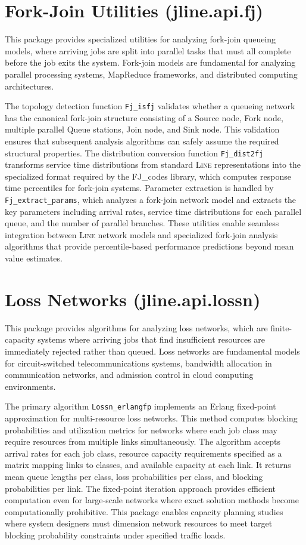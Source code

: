 \section{Fork-Join Utilities (jline.api.fj)}

This package provides specialized utilities for analyzing fork-join queueing models, where arriving jobs are split into parallel tasks that must all complete before the job exits the system. Fork-join models are fundamental for analyzing parallel processing systems, MapReduce frameworks, and distributed computing architectures.

The topology detection function \texttt{Fj\_isfj} validates whether a queueing network has the canonical fork-join structure consisting of a Source node, Fork node, multiple parallel Queue stations, Join node, and Sink node. This validation ensures that subsequent analysis algorithms can safely assume the required structural properties. The distribution conversion function \texttt{Fj\_dist2fj} transforms service time distributions from standard \textsc{Line} representations into the specialized format required by the FJ\_codes library, which computes response time percentiles for fork-join systems. Parameter extraction is handled by \texttt{Fj\_extract\_params}, which analyzes a fork-join network model and extracts the key parameters including arrival rates, service time distributions for each parallel queue, and the number of parallel branches. These utilities enable seamless integration between \textsc{Line} network models and specialized fork-join analysis algorithms that provide percentile-based performance predictions beyond mean value estimates.

\section{Loss Networks (jline.api.lossn)}

This package provides algorithms for analyzing loss networks, which are finite-capacity systems where arriving jobs that find insufficient resources are immediately rejected rather than queued. Loss networks are fundamental models for circuit-switched telecommunications systems, bandwidth allocation in communication networks, and admission control in cloud computing environments.

The primary algorithm \texttt{Lossn\_erlangfp} implements an Erlang fixed-point approximation for multi-resource loss networks. This method computes blocking probabilities and utilization metrics for networks where each job class may require resources from multiple links simultaneously. The algorithm accepts arrival rates for each job class, resource capacity requirements specified as a matrix mapping links to classes, and available capacity at each link. It returns mean queue lengths per class, loss probabilities per class, and blocking probabilities per link. The fixed-point iteration approach provides efficient computation even for large-scale networks where exact solution methods become computationally prohibitive. This package enables capacity planning studies where system designers must dimension network resources to meet target blocking probability constraints under specified traffic loads.

